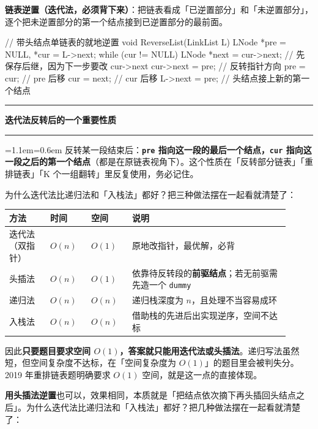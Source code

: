 \documentclass[11pt,openany,UTF8]{ctexbook}
\newcommand{\callouthead}[2]{%
  \par\addvspace{7pt}\noindent
  {\color{#1}\rule[-0.15em]{3pt}{1.05em}}\hspace{0.5em}%
  {\bfseries\color{#1}#2}\par\nobreak\vspace{-0.35em}%
  {\color{rulesep}\hrule height 0.4pt}\nobreak\vspace{0.45em}%
  \begingroup\small\setlength{\parindent}{0pt}%
  \leftskip=1.1em\rightskip=0.6em\noindent\ignorespaces}
\newcommand{\calloutend}{\par\endgroup\addvspace{7pt}}
\newenvironment{callkey}[1]{\callouthead{keybar}{#1}}{\calloutend}
\begin{document}
\textbf{链表逆置（迭代法，必须背下来）}：把链表看成「已逆置部分」和「未逆置部分」，逐个把未逆置部分的第一个结点接到已逆置部分的最前面。

\begin{codebox}
// 带头结点单链表的就地逆置
void ReverseList(LinkList L) {
    LNode *pre = NULL, *cur = L->next;
    while (cur != NULL) {
        LNode *next = cur->next;  // 先保存后继，因为下一步要改 cur->next
        cur->next = pre;          // 反转指针方向
        pre = cur;                // pre 后移
        cur = next;               // cur 后移
    }
    L->next = pre;                // 头结点接上新的第一个结点
}
\end{codebox}

\begin{callkey}{迭代法反转后的一个重要性质}
反转某一段结束后：\textbf{\texttt{pre} 指向这一段的最后一个结点，\texttt{cur} 指向这一段之后的第一个结点}（都是在原链表视角下）。这个性质在「反转部分链表」「重排链表」「K 个一组翻转」里反复使用，务必记住。

\end{callkey}

为什么迭代法比递归法和「入栈法」都好？把三种做法摆在一起看就清楚了：

\begingroup\small\setlength{\tabcolsep}{4.0pt}
\begin{longtable}{@{}L{0.1354\linewidth}L{0.1354\linewidth}L{0.1354\linewidth}L{0.5051\linewidth}@{}}
\toprule
\textbf{方法} & \textbf{时间} & \textbf{空间} & \textbf{说明} \\
\midrule
\endhead
迭代法（双指针） & $O(n)$ & $O(1)$ & 原地改指针，最优解，必背 \\
头插法 & $O(n)$ & $O(1)$ & 依靠待反转段的\textbf{前驱结点}；若无前驱需先造一个 \texttt{dummy} \\
递归法 & $O(n)$ & $O(n)$ & 递归栈深度为 $n$，且处理不当容易成环 \\
入栈法 & $O(n)$ & $O(n)$ & 借助栈的先进后出实现逆序，空间不达标 \\
\bottomrule
\end{longtable}
\endgroup

因此\textbf{只要题目要求空间 $O(1)$，答案就只能用迭代法或头插法}。递归写法虽然短，但空间复杂度不达标，在「空间复杂度为 $O(1)$」的题目里会被判失分。2019 年重排链表题明确要求 $O(1)$ 空间，就是这一点的直接体现。

\textbf{用头插法逆置}也可以，效果相同，本质就是「把结点依次摘下再头插回头结点之后」。为什么迭代法比递归法和「入栈法」都好？把几种做法摆在一起看就清楚了：
\end{document}
